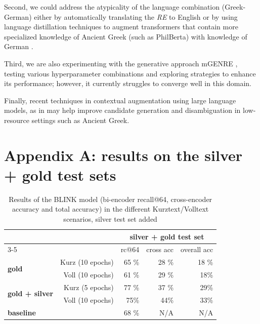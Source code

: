 \documentclass[final]{anthology-ch}
\begin{document}
Second, we could address the atypicality of the language combination (Greek-German) either by automatically translating the \textit{RE} to English or by using language distillation techniques to augment transformers that contain more specialized knowledge of Ancient Greek (such as PhilBerta) with knowledge of German \cite{gao-etal-2021-simcse}.

Third, we are also experimenting with the generative approach mGENRE \cite{de_cao_multilingual_2022}, testing various hyperparameter combinations and  exploring strategies to enhance its performance; however, it currently struggles to converge well in this domain.

Finally, recent techniques in contextual augmentation using large language models, as in \textcite{vollmers-etal-2025-contextual} may help improve candidate generation and disambiguation in low-resource settings such as Ancient Greek.

\printbibliography

\appendix

\section{Appendix A: results on the silver + gold test sets} \label{appdx:a}

\begin{table}[h!]
\centering
\begin{tabular}{lrrrr}
\toprule
& &  \multicolumn{3}{c}{{\bf silver + gold test set}} \\
\cmidrule(lr){3-5} 
& & rc@64 & cross acc & overall acc  \\
\midrule
\multirow{2}{*}{\bf gold} & Kurz (10 epochs)  & 65 \% &  28 \% & 18 \% \\ 
& Voll (10 epochs) & 61 \% & 29 \% &  18\% \\ 
\multirow{2}{*}{\bf gold + silver} & Kurz (5 epochs)  &  77 \% & 37 \% & 29\% \\ 
& Voll (10 epochs) & 75\% & 44\% & 33\% \\
\midrule
\bf baseline & & 68 \% & N/A & N/A \\
\bottomrule     
\end{tabular}
\caption{Results of the BLINK model (bi-encoder recall@64, cross-encoder accuracy and total accuracy) in the different Kurztext/Volltext scenarios, silver test set added}
\label{tab:results BLINK silver}
\end{table}
\end{document}
